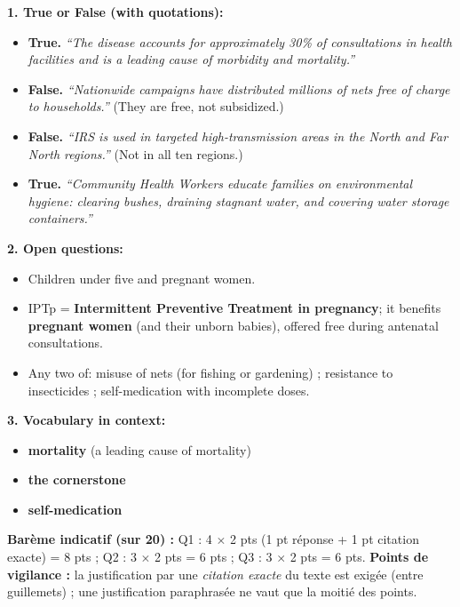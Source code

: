 \documentclass[11pt]{article}
\begin{document}
\begin{corrige}
\textbf{1. True or False (with quotations):}
\begin{itemize}
    \item[a)] \textbf{True.} \emph{``The disease accounts for approximately 30\% of consultations in health facilities and is a leading cause of morbidity and mortality.''}
    \item[b)] \textbf{False.} \emph{``Nationwide campaigns have distributed millions of nets free of charge to households.''} (They are free, not subsidized.)
    \item[c)] \textbf{False.} \emph{``IRS is used in targeted high-transmission areas in the North and Far North regions.''} (Not in all ten regions.)
    \item[d)] \textbf{True.} \emph{``Community Health Workers educate families on environmental hygiene: clearing bushes, draining stagnant water, and covering water storage containers.''}
\end{itemize}
\textbf{2. Open questions:}
\begin{itemize}
    \item[e)] Children under five and pregnant women.
    \item[f)] IPTp = \textbf{Intermittent Preventive Treatment in pregnancy}; it benefits \textbf{pregnant women} (and their unborn babies), offered free during antenatal consultations.
    \item[g)] Any two of: misuse of nets (for fishing or gardening) ; resistance to insecticides ; self-medication with incomplete doses.
\end{itemize}
\textbf{3. Vocabulary in context:}
\begin{itemize}
    \item[h)] \textbf{mortality} (a leading cause of mortality)
    \item[i)] \textbf{the cornerstone}
    \item[j)] \textbf{self-medication}
\end{itemize}
\textbf{Barème indicatif (sur 20) :} Q1 : 4 $\times$ 2 pts (1 pt réponse + 1 pt citation exacte) = 8 pts ; Q2 : 3 $\times$ 2 pts = 6 pts ; Q3 : 3 $\times$ 2 pts = 6 pts.
\textbf{Points de vigilance :} la justification par une \emph{citation exacte} du texte est exigée (entre guillemets) ; une justification paraphrasée ne vaut que la moitié des points.
\end{corrige}
\end{document}
